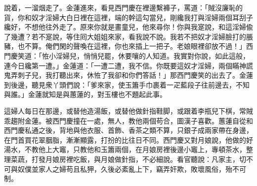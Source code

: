 說着，一溜烟走了。金蓮進來，看見西門慶在裡邊繫褲子，罵道：「賊沒廉恥的貨，你和奴才淫婦大白日裡在這裡，端的幹這勾當兒，剛纔我打與淫婦兩個耳刮子纔好，不想他往外走了。原來你就是畫童兒，他來尋你！你與我寔說，和這淫婦偸了幾遭？若不寔說，等住囘大姐姐來家，看我說不說。我若不把奴才淫婦臉打的脹豬，也不算。俺們閑的聲喚在這裡，你也來插上一把子。{}老娘眼裡卻放不過！」西門慶笑道：「恠小淫婦兒，悄悄兒罷，休要嚷的人知道。我實對你說，如此這般，連今日纔第一遭。」金蓮道：「一遭二遭，我不信。你既要這奴才淫婦，兩個瞞神謊鬼弄刺子兒，我打聽出來，休恠了我卻和你們答話！」那西門慶笑的出去了。金蓮到後邊，聽見衆丫頭們說：「爹來家，使玉簫手巾裹着一疋藍段子往前邊去，不知與誰。」金蓮就知是與蕙蓮的，對玉樓也不題起此事。

這婦人每日在那邊，或替他造湯飯，或替他做針指鞋脚，或跟着李瓶兒下棋，常賊乖趨附金蓮。被西門慶撞在一處，無人，教他兩個苟合，圖漢子喜歡。蕙蓮自從和西門慶私通之後，背地與他衣服、首飾、香茶之類不算，只銀子成兩家帶在身邊，在門首買花翠胭脂，漸漸顯露，打扮的比往日不同。西門慶又對月娘說，他做的好湯水，不教他上大竈，只教他和玉簫兩個，在月娘房裡後邊小竈上，專頓茶水，整理菜蔬，打發月娘房裡吃飯，與月娘做針指，不必細說。看官聽說：凡家主，切不可與奴僕並家人之婦苟且私狎，久後必紊亂上下，竊弄奸欺，敗壞風俗，殆不可制。

